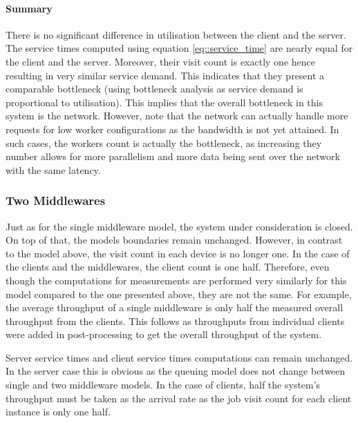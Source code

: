 \documentclass[11pt,a4paper]{article}
\begin{document}
\paragraph{Summary}
There is no significant difference in utilisation between the client and the server. The service times computed using equation \ref{eq::service_time} are nearly equal for the client and the server. Moreover, their visit count is exactly one hence resulting in very similar service demand. This indicates that they present a comparable bottleneck (using bottleneck analysis as service demand is proportional to utilisation). This implies that the overall bottleneck in this system is the network. However, note that the network can actually handle more requests for low worker configurations as the bandwidth is not yet attained. In such cases, the workers count is actually the bottleneck, as increasing they number allows for more parallelism and more data being sent over the network with the same latency.


\subsubsection{Two Middlewares}
Just as for the single middleware model, the system under consideration is closed. On top of that, the models boundaries remain unchanged. However, in contrast to the model above, the visit count in each device is no longer one. In the case of the clients and the middlewares, the client count is one half. Therefore, even though the computations for measurements are performed very similarly for this model compared to the one presented above, they are not the same. For example, the average throughput of a single middleware is only half the measured overall throughput from the clients. This follows as throughputs from individual clients were added in post-processing to get the overall throughput of the system.

Server service times and client service times computations can remain unchanged. In the server case this is obvious as the queuing model does not change between single and two middleware models. In the case of clients, half the system's throughput must be taken as the arrival rate as the job visit count for each client instance is only one half.
\end{document}
